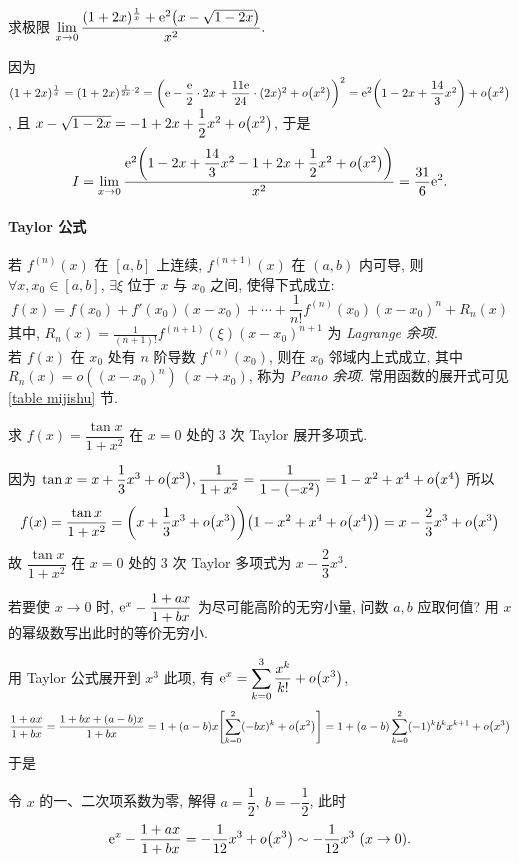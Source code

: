 \begin{example}
    求极限 $\displaystyle \lim_{x\to0}\dfrac{(1+2x)^{\frac{1}{x}}+\mathrm{e}^{2}\qty(x-\sqrt{1-2x})}{x^2}.$
\end{example}
\begin{solution}
    因为 $(1+2x)^{\frac{1}{x}}=(1+2x)^{\frac{1}{2x}\cdot 2}=\qty(\mathrm{e}-\dfrac{\mathrm{e}}{2}\cdot2x+\dfrac{11\mathrm{e}}{24}\cdot(2x)^2+o\qty(x^2))^2=\mathrm{e}^2\qty(1-2x+\dfrac{14}{3}x^2)+o\qty(x^2)$, 且 $x-\sqrt{1-2x}=-1+2x+\dfrac{1}{2}x^2+o\qty(x^2)$, 于是
    $$I=\lim_{x\to0}\dfrac{\mathrm{e}^2\qty(1-2x+\dfrac{14}{3}x^2-1+2x+\dfrac{1}{2}x^2+o\qty(x^2))}{x^2}=\dfrac{31}{6}\mathrm{e}^2.$$
\end{solution}

\paragraph{Taylor 公式}
若 $f^{(n)}(x)$ 在 $[a,b]$ 上连续, $f^{(n+1)}(x)$ 在 $(a,b)$ 内可导, 则 $\forall x,x_0\in[a,b]$, $\exists \xi$ 位于 $x$ 与 $x_0$ 之间, 使得下式成立:
$$f(x)=f(x_0)+f'(x_0)(x-x_0)+\cdots+\frac{1}{n!}f^{(n)}(x_0)(x-x_0)^n+R_n(x)$$
其中, $\displaystyle R_n(x)=\frac{1}{(n+1)!}f^{(n+1)}(\xi)(x-x_0)^{n+1}$ 为 \textit{Lagrange 余项}.\\
若 $f(x)$ 在 $x_0$ 处有 $n$ 阶导数 $f^{(n)}(x_0)$, 则在 $x_0$ 邻域内上式成立,
其中 $R_n(x)=o((x-x_0)^n)~ (x\to x_0)$, 称为 \textit{Peano 余项}. 常用函数的展开式可见 \ref{table mijishu} 节.

\begin{example}
    求 $f(x)=\dfrac{\tan x}{1+x^2}$ 在 $x=0$ 处的 3 次 Taylor 展开多项式.
\end{example}
\begin{solution}
    因为 $\tan x=x+\dfrac{1}{3}x^3+o\qty(x^3), \dfrac{1}{1+x^2}=\dfrac{1}{1-\qty(-x^2)}=1-x^2+x^4+o\qty(x^4)$
    所以 $$
    f(x)=\dfrac{\tan x}{1+x^2}=\qty(x+\dfrac{1}{3}x^3+o\qty(x^3))\qty(1-x^2+x^4+o\qty(x^4))=x-\dfrac{2}{3}x^3+o\qty(x^3)
    $$
    故 $\dfrac{\tan x}{1+x^2}$ 在 $x=0$ 处的 3 次 Taylor 多项式为 $x-\dfrac{2}{3}x^3.$
\end{solution}

\begin{example}
    若要使 $x\to0$ 时, $\mathrm{e}^x-\dfrac{1+ax}{1+bx}$ 为尽可能高阶的无穷小量, 问数 $a,b$ 应取何值? 用 $x$ 的幂级数写出此时的等价无穷小.
\end{example}
\begin{solution}
    用 Taylor 公式展开到 $x^3$ 此项, 有 $\displaystyle\mathrm{e}^x=\sum_{k=0}^{3}\dfrac{x^k}{k!}+o\qty(x^3)$,
    $$\dfrac{1+ax}{1+bx}=\dfrac{1+bx+(a-b)x}{1+bx}=1+(a-b)x\qty[\sum_{k=0}^{2}(-bx)^k+o\qty(x^2)]=1+(a-b)\sum_{k=0}^{2}(-1)^kb^kx^{k+1}+o\qty(x^3)$$
    于是
    令 $x$ 的一、二次项系数为零, 解得 $a=\dfrac{1}{2},~b=-\dfrac{1}{2}$, 此时 $$\mathrm{e}^x-\dfrac{1+ax}{1+bx}=-\dfrac{1}{12}x^3+o\qty(x^3)\sim-\dfrac{1}{12}x^3~ (x\to0).$$
\end{solution}

